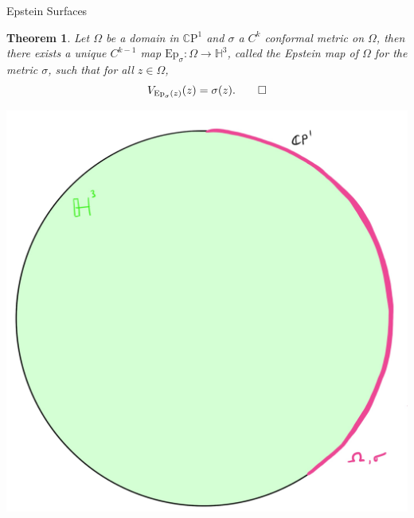 \documentclass[professionalfont]{beamer}
\newcommand{\CP}{\mathbb{C}\mathrm{P}}
\renewcommand{\H}{\mathbb{H}}
\newtheorem{thm}{Theorem}[section]
\begin{document}


\begin{frame}{Epstein Surfaces}


\begin{thm}
Let $\Omega$ be a domain in $\CP^1$  and $\sigma$ a $C^k$ conformal metric on $\Omega$, then there exists a unique $C^{k-1}$ map $\mathrm{Ep}_\sigma : \Omega \to \H^3$, called the Epstein map of $\Omega$ for the metric $\sigma$, such that for all $z \in \Omega$,
\[
V_{\mathrm{Ep}_\sigma(z)}(z) = \sigma(z). \qed
\]
\end{thm}


\centering\includegraphics[scale=0.07]{Epstein-1.jpg}

\end{frame}
\end{document}
